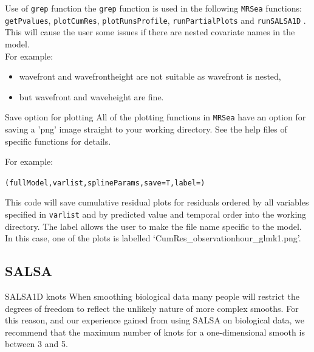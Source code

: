 \begin{block}{Use of {\tt grep} function}
the {\tt grep} function is used in the following {\tt MRSea} functions: {\tt getPvalues}, {\tt plotCumRes}, {\tt plotRunsProfile}, {\tt runPartialPlots} and {\tt runSALSA1D} .  This will cause the user some issues if there are nested covariate names in the model. \\

For example:  
\begin{itemize}
\item wavefront and wavefrontheight are not suitable as wavefront is nested,
\item but wavefront and waveheight are fine.
\end{itemize}
\end{block}

\begin{block}{Save option for plotting}
\noindent All of the plotting functions in {\tt MRSea} have an option for saving a 'png' image straight to your working directory. See the help files of specific functions for details.

\noindent For example:
\begin{knitrout}\footnotesize
{}\color{fgcolor}\begin{kframe}
\begin{alltt}
(fullModel, varlist, splineParams, save=T, label=)
\end{alltt}
\end{kframe}
\end{knitrout}
\end{block}

\noindent This code will save cumulative residual plots for residuals ordered by all variables specified in {\tt varlist} and by predicted value and temporal order into the working directory.  The label allows the user to make the file name specific to the model.  In this case, one of the plots is labelled `CumRes\_observationhour\_glmk1.png'.


\subsection{SALSA}
\label{tips:subsec:salsa}
\begin{block}{SALSA1D knots}
When smoothing biological data many people will restrict the degrees of freedom to reflect the unlikely nature of more complex smooths.  For this reason, and our experience gained from using SALSA on biological data, we recommend that the maximum number of knots for a one-dimensional smooth is between 3 and 5.
\end{block}

